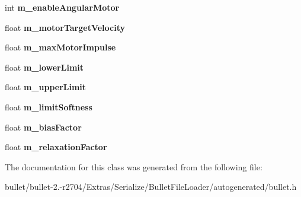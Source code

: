 \begin{DoxyCompactItemize}
\item 
\hypertarget{class_bullet_1_1bt_hinge_constraint_float_data_a41e2050d836d4bd869e042425fd99cdc}{int {\bfseries m\+\_\+enable\+Angular\+Motor}}\label{class_bullet_1_1bt_hinge_constraint_float_data_a41e2050d836d4bd869e042425fd99cdc}

\item 
\hypertarget{class_bullet_1_1bt_hinge_constraint_float_data_a937b042978f08eb94aab15461559c6ae}{float {\bfseries m\+\_\+motor\+Target\+Velocity}}\label{class_bullet_1_1bt_hinge_constraint_float_data_a937b042978f08eb94aab15461559c6ae}

\item 
\hypertarget{class_bullet_1_1bt_hinge_constraint_float_data_a9bdacce5582680005c087554810ae8d1}{float {\bfseries m\+\_\+max\+Motor\+Impulse}}\label{class_bullet_1_1bt_hinge_constraint_float_data_a9bdacce5582680005c087554810ae8d1}

\item 
\hypertarget{class_bullet_1_1bt_hinge_constraint_float_data_a5a71ec145d14eb27d9d1001862c28ffd}{float {\bfseries m\+\_\+lower\+Limit}}\label{class_bullet_1_1bt_hinge_constraint_float_data_a5a71ec145d14eb27d9d1001862c28ffd}

\item 
\hypertarget{class_bullet_1_1bt_hinge_constraint_float_data_a2363e069abc542c8f391471c7759c0a5}{float {\bfseries m\+\_\+upper\+Limit}}\label{class_bullet_1_1bt_hinge_constraint_float_data_a2363e069abc542c8f391471c7759c0a5}

\item 
\hypertarget{class_bullet_1_1bt_hinge_constraint_float_data_ad898235dc0adfbccc2fd781ed56c0b63}{float {\bfseries m\+\_\+limit\+Softness}}\label{class_bullet_1_1bt_hinge_constraint_float_data_ad898235dc0adfbccc2fd781ed56c0b63}

\item 
\hypertarget{class_bullet_1_1bt_hinge_constraint_float_data_ab2133937695bdea03a554f6f16822146}{float {\bfseries m\+\_\+bias\+Factor}}\label{class_bullet_1_1bt_hinge_constraint_float_data_ab2133937695bdea03a554f6f16822146}

\item 
\hypertarget{class_bullet_1_1bt_hinge_constraint_float_data_a7f618ee09e353a3e49a277cfb04e9dc8}{float {\bfseries m\+\_\+relaxation\+Factor}}\label{class_bullet_1_1bt_hinge_constraint_float_data_a7f618ee09e353a3e49a277cfb04e9dc8}

\end{DoxyCompactItemize}


The documentation for this class was generated from the following file\+:\begin{DoxyCompactItemize}
\item 
bullet/bullet-\/2.-\/r2704/\+Extras/\+Serialize/\+Bullet\+File\+Loader/autogenerated/bullet.\+h\end{DoxyCompactItemize}
